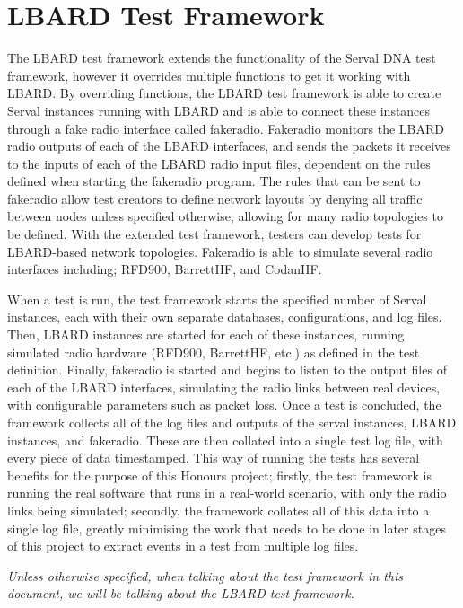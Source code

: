 \section{LBARD Test Framework}
The LBARD test framework extends the functionality of the Serval DNA test framework, however it overrides multiple functions to get it working with LBARD.
By overriding functions, the LBARD test framework is able to create Serval instances running with LBARD and is able to connect these instances through a fake radio interface called fakeradio.
Fakeradio monitors the LBARD radio outputs of each of the LBARD interfaces, and sends the packets it receives to the inputs of each of the LBARD radio input files, dependent on the rules defined when starting the fakeradio program.
The rules that can be sent to fakeradio allow test creators to define network layouts by denying all traffic between nodes unless specified otherwise, allowing for many radio topologies to be defined.
With the extended test framework, testers can develop tests for LBARD-based network topologies.
Fakeradio is able to simulate several radio interfaces including; RFD900, BarrettHF, and CodanHF.


When a test is run, the test framework starts the specified number of Serval instances, each with their own separate databases, configurations, and log files.
Then, LBARD instances are started for each of these instances, running simulated radio hardware (RFD900, BarrettHF, etc.) as defined in the test definition.
Finally, fakeradio is started and begins to listen to the output files of each of the LBARD interfaces, simulating the radio links between real devices, with configurable parameters such as packet loss.
Once a test is concluded, the framework collects all of the log files and outputs of the serval instances, LBARD instances, and fakeradio.
These are then collated into a single test log file, with every piece of data timestamped.
This way of running the tests has several benefits for the purpose of this Honours project; firstly, the test framework is running the real software that runs in a real-world scenario, with only the radio links being simulated; secondly, the framework collates all of this data into a single log file, greatly minimising the work that needs to be done in later stages of this project to extract events in a test from multiple log files.

\emph{Unless otherwise specified, when talking about the test framework in this document, we will be talking about the LBARD test framework.}


